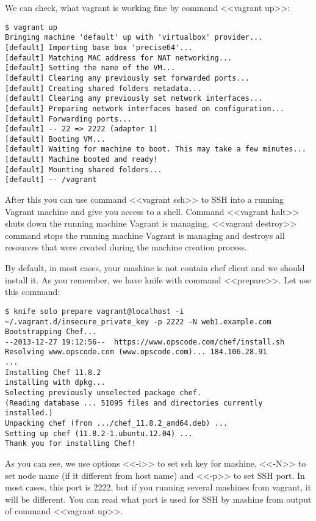 We can check, what vagrant is working fine by command <<vagrant up>>:

\begin{lstlisting}[label=lst:my-cloud-vagrant4]
$ vagrant up
Bringing machine 'default' up with 'virtualbox' provider...
[default] Importing base box 'precise64'...
[default] Matching MAC address for NAT networking...
[default] Setting the name of the VM...
[default] Clearing any previously set forwarded ports...
[default] Creating shared folders metadata...
[default] Clearing any previously set network interfaces...
[default] Preparing network interfaces based on configuration...
[default] Forwarding ports...
[default] -- 22 => 2222 (adapter 1)
[default] Booting VM...
[default] Waiting for machine to boot. This may take a few minutes...
[default] Machine booted and ready!
[default] Mounting shared folders...
[default] -- /vagrant
\end{lstlisting}

After this you can use command <<vagrant ssh>> to SSH into a running Vagrant machine and give you access to a shell. Command <<vagrant halt>> shuts down the running machine Vagrant is managing. <<vagrant destroy>> command stops the running machine Vagrant is managing and destroys all resources that were created during the machine creation process.

By default, in most cases, your mashine is not contain chef client and we should install it. As you remember, we have knife with command <<prepare>>. Let use this command:

\begin{lstlisting}[label=lst:my-cloud-vagrant5]
$ knife solo prepare vagrant@localhost -i ~/.vagrant.d/insecure_private_key -p 2222 -N web1.example.com
Bootstrapping Chef...
--2013-12-27 19:12:56--  https://www.opscode.com/chef/install.sh
Resolving www.opscode.com (www.opscode.com)... 184.106.28.91
...
Installing Chef 11.8.2
installing with dpkg...
Selecting previously unselected package chef.
(Reading database ... 51095 files and directories currently installed.)
Unpacking chef (from .../chef_11.8.2_amd64.deb) ...
Setting up chef (11.8.2-1.ubuntu.12.04) ...
Thank you for installing Chef!
\end{lstlisting}

As you can see, we use options <<-i>> to set ssh key for mashine, <<-N>> to set node name (if it different from host name) and <<-p>> to set SSH port. In most cases, this port is 2222, but if you running several mashines from vagrant, it will be different. You can read what port is used for SSH by mashine from output of command <<vagrant up>>.

